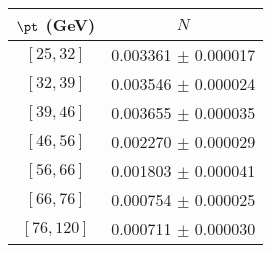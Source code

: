 \begin{tabular}{c||c}
$\pt$ (GeV) & $N$  \\
\hline
$[25, 32]$ & 0.003361 $\pm$ 0.000017\\
$[32, 39]$ & 0.003546 $\pm$ 0.000024\\
$[39, 46]$ & 0.003655 $\pm$ 0.000035\\
$[46, 56]$ & 0.002270 $\pm$ 0.000029\\
$[56, 66]$ & 0.001803 $\pm$ 0.000041\\
$[66, 76]$ & 0.000754 $\pm$ 0.000025\\
$[76, 120]$ & 0.000711 $\pm$ 0.000030\\
\end{tabular}
